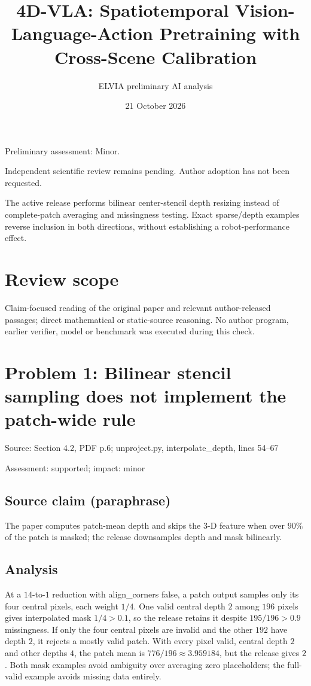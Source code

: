 \documentclass[11pt]{article}
\begin{document}
\title{4D-VLA:  Spatiotemporal Vision-Language-Action Pretraining with Cross-Scene Calibration}

\author{ELVIA preliminary AI analysis}\date{21 October 2026}\maketitle

Preliminary assessment: Minor.\par

Independent scientific review remains pending. Author adoption has not been requested.

The active release performs bilinear center-stencil depth resizing instead of complete-patch averaging and missingness testing. Exact sparse/depth examples reverse inclusion in both directions, without establishing a robot-performance effect.

\section*{Review scope}

Claim-focused reading of the original paper and relevant author-released passages; direct mathematical or static-source reasoning. No author program, earlier verifier, model or benchmark was executed during this check.

\section*{Problem 1: Bilinear stencil sampling does not implement the patch-wide rule}

Source: Section 4.2, PDF p.6; unproject.py, interpolate\_depth, lines 54–67

Assessment: supported; impact: minor

\subsection*{Source claim (paraphrase)}

The paper computes patch-mean depth and skips the \(3\)-D feature when over \(90\%\) of the patch is masked; the release downsamples depth and mask bilinearly.

\subsection*{Analysis}

At a \(14\)-to-\(1\) reduction with align\_corners false, a patch output samples only its four central pixels, each weight \(1/4\). One valid central depth \(2\) among \(196\) pixels gives interpolated mask \(1/4>0.1\), so the release retains it despite \(195/196>0.9\) missingness. If only the four central pixels are invalid and the other \(192\) have depth \(2\), it rejects a mostly valid patch. With every pixel valid, central depth \(2\) and other depths \(4\), the patch mean is \(776/196\approx3.959184\), but the release gives \(2\). Both mask examples avoid ambiguity over averaging zero placeholders; the full-valid example avoids missing data entirely.
\end{document}

